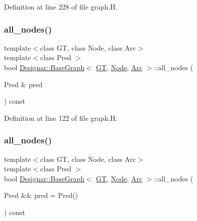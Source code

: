 Definition at line 228 of file graph.\+H.

\mbox{\label{class_designar_1_1_base_graph_abad9513273c1096aba652e211180061c}} 
\subsubsection{\texorpdfstring{all\+\_\+nodes()}{all\_nodes()}\hspace{0.1cm}{\footnotesize\ttfamily [1/2]}}
{\footnotesize\ttfamily template$<$class GT, class Node, class Arc$>$ \\
template$<$class Pred $>$ \\
bool \hyperlink{class_designar_1_1_base_graph}{Designar\+::\+Base\+Graph}$<$ \hyperlink{demo-buildgraph_8_c_a3001c40d2c31ca87ed96cd7d1334a55e}{GT}, \hyperlink{namespace_designar_a5af326c65aa2bd26b26c410f2030d09e}{Node}, \hyperlink{namespace_designar_a3f55fb5513d62ff47cbc8f72b8e95d6f}{Arc} $>$\+::all\+\_\+nodes (\begin{DoxyParamCaption}\item[{Pred \&}]{pred }\end{DoxyParamCaption}) const\hspace{0.3cm}{\ttfamily [inline]}}



Definition at line 122 of file graph.\+H.

\mbox{\label{class_designar_1_1_base_graph_a32419ec17712a60c1964bc91e78d135c}} 
\subsubsection{\texorpdfstring{all\+\_\+nodes()}{all\_nodes()}\hspace{0.1cm}{\footnotesize\ttfamily [2/2]}}
{\footnotesize\ttfamily template$<$class GT, class Node, class Arc$>$ \\
template$<$class Pred $>$ \\
bool \hyperlink{class_designar_1_1_base_graph}{Designar\+::\+Base\+Graph}$<$ \hyperlink{demo-buildgraph_8_c_a3001c40d2c31ca87ed96cd7d1334a55e}{GT}, \hyperlink{namespace_designar_a5af326c65aa2bd26b26c410f2030d09e}{Node}, \hyperlink{namespace_designar_a3f55fb5513d62ff47cbc8f72b8e95d6f}{Arc} $>$\+::all\+\_\+nodes (\begin{DoxyParamCaption}\item[{Pred \&\&}]{pred = {\ttfamily Pred()} }\end{DoxyParamCaption}) const\hspace{0.3cm}{\ttfamily [inline]}}



